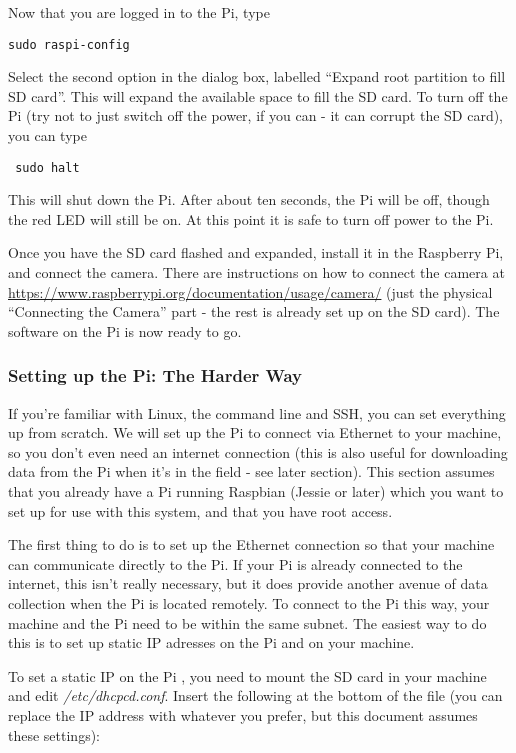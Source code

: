 \documentclass[10pt]{article}
\begin{document}
Now that you are logged in to the Pi, type 
\begin{verbatim}
sudo raspi-config
\end{verbatim}

Select the second option in the dialog box, labelled ``Expand root partition to fill SD card''. This will expand the available space to fill the SD card. To turn off the Pi (try not to just switch off the power, if you can - it can corrupt the SD card), you can type
\begin{verbatim}
 sudo halt
\end{verbatim}

This will shut down the Pi. After about ten seconds, the Pi will be off, though the red LED will still be on. At this point it is safe to turn off power to the Pi.
 
Once you have the SD card flashed and expanded, install it in the Raspberry Pi, and connect the camera. There are instructions on how to connect the camera at
\url{https://www.raspberrypi.org/documentation/usage/camera/} (just the physical ``Connecting the Camera'' part - the rest is already set up on the SD card). The software on the Pi is now ready to go. 

\subsubsection{Setting up the Pi: The Harder Way}
If you're familiar with Linux, the command line and SSH, you can set everything up from scratch. We will set up the Pi to connect via Ethernet to your machine, so you don't even need an internet connection (this is also useful for downloading data from the Pi when it's in the field - see later section). This section assumes that you already have a Pi running Raspbian (Jessie or later) which you want to set up for use with this system, and that you have root access. 

The first thing to do is to set up the Ethernet connection so that your machine can communicate directly to the Pi. If your Pi is already connected to the internet, this
isn't really necessary, but it does provide another avenue of data collection when the Pi is located remotely. To connect to the Pi this way, your machine and the Pi 
need to be within the same subnet. The easiest way to do this is to set up static IP adresses on the Pi and on your machine.

To set a static IP on the Pi , you need to mount the SD card in your machine and edit \textit{/etc/dhcpcd.conf}. Insert the following at the bottom of the file (you can 
replace the IP address with whatever you prefer, but this document assumes these settings):
\end{document}
